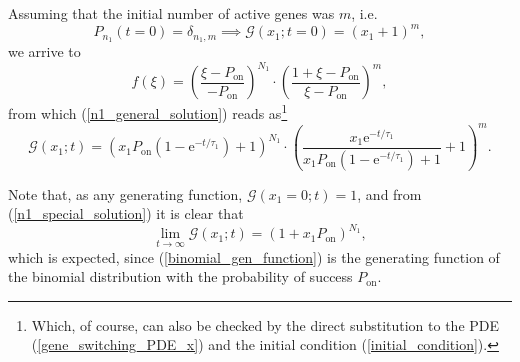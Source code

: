 \documentclass[a4paper, 11pt]{article}
\begin{document}
Assuming that the initial number of active genes was $m$, i.e.
\begin{equation}\label{initial_condition}
  P_{n_1}(t=0) = \delta_{n_1,m} \implies \mathcal G(x_1; t=0) = (x_1+1)^m,
\end{equation}
we arrive to
\begin{equation*}
  f(\xi) = \left(\frac{\xi - P_\text{on}}{-P_{\text{on}}}\right)^{N_1}\cdot\left(\frac{1+\xi-P_\text{on}}{\xi-P_{\text{on}}}\right)^m,
\end{equation*}
from which (\ref{n1_general_solution}) reads as\footnote{Which, of course, can also be checked by the direct substitution to the PDE (\ref{gene_switching_PDE_x}) and the initial condition (\ref{initial_condition}).}
\begin{equation}\label{n1_special_solution}
  \mathcal G(x_1; t) = \left(x_1P_\text{on}\left(1-\mathrm e^{-t/\tau_1}\right)+1\right)^{N_1}\cdot\left(\frac{x_1\mathrm e^{-t/\tau_1}}{x_1P_\text{on}\left(1-\mathrm e^{-t/\tau_1}\right)+1} + 1\right)^m.
\end{equation}


Note that, as any generating function, $\mathcal G(x_1=0; t)=1$, and from (\ref{n1_special_solution}) it is clear that
\begin{equation}\label{binomial_gen_function}
  \lim_{t\to\infty}\mathcal G(x_1; t) = \left(1 + x_1P_\text{on}\right)^{N_1},
\end{equation}
which is expected, since (\ref{binomial_gen_function}) is the generating function of the binomial distribution with the probability of success $P_\text{on}$.
\end{document}
